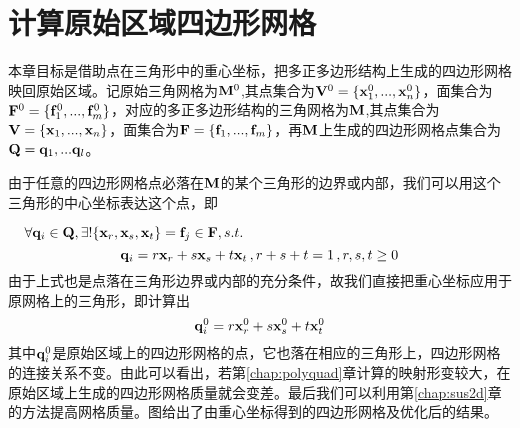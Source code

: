 \chapter{计算原始区域四边形网格}\label{chap:mapback}

本章目标是借助点在三角形中的重心坐标，把多正多边形结构上生成的四边形网格映回原始区域。记原始三角网格为$\mathbf{M}^0$,其点集合为$\mathbf{V}^0=\{\mathbf{x}_1^0,...,\mathbf{x}_n^0\}$，面集合为$\mathbf{F}^0=\{\mathbf{f}_1^0,...,\mathbf{f}_m^0\}$，对应的多正多边形结构的三角网格为$\mathbf{M} $,其点集合为$\mathbf{V}=\{\mathbf{x}_1,...,\mathbf{x}_n\}$，面集合为$\mathbf{F}=\{\mathbf{f}_1,...,\mathbf{f}_m\}$，再$\mathbf{M}$上生成的四边形网格点集合为$\mathbf{Q}={\mathbf{q}_1,...\mathbf{q}_l}$。

由于任意的四边形网格点必落在$\mathbf{M}$的某个三角形的边界或内部，我们可以用这个三角形的中心坐标表达这个点，即

$\,\,\,\,\,\,\,\forall \mathbf{q}_i \in \mathbf{Q}, \exists ! \{\mathbf{x}_r,\mathbf{x}_s,\mathbf{x}_t\}=\mathbf{f}_j \in \mathbf{F}, s.t.$
\begin{equation}\label{equ:meancoor}
\mathbf{q}_i=r\mathbf{x}_r+s\mathbf{x}_s+t\mathbf{x}_t\,,r+s+t=1\,,r,s,t\geq 0
\end{equation}
由于上式也是点落在三角形边界或内部的充分条件，故我们直接把重心坐标应用于原网格上的三角形，即计算出
\begin{equation} \label{equ:quadvertex}
\mathbf{q}_i^0=r\mathbf{x}_r^0+s\mathbf{x}_s^0+t\mathbf{x}_t^0
\end{equation}
其中$\mathbf{q}_i^0$是原始区域上的四边形网格的点，它也落在相应的三角形上，四边形网格的连接关系不变。由此可以看出，若第\ref{chap:polyquad}章计算的映射形变较大，在原始区域上生成的四边形网格质量就会变差。最后我们可以利用第\ref{chap:sus2d}章的方法提高网格质量。图给出了由重心坐标得到的四边形网格及优化后的结果。

